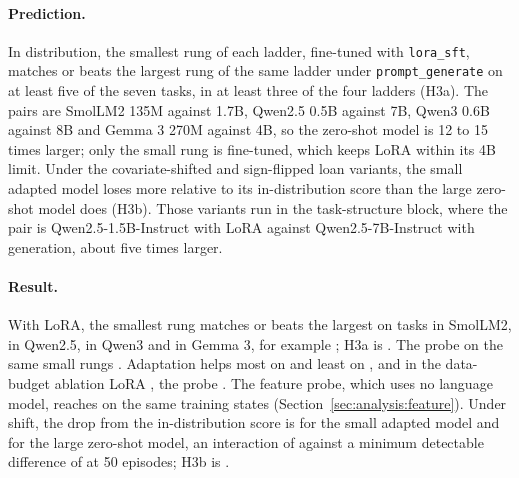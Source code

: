 \paragraph{Prediction.} In distribution, the smallest rung of each ladder, fine-tuned with \texttt{lora\_sft}, matches or beats the largest rung of the same ladder under \texttt{prompt\_generate} on at least five of the seven tasks, in at least three of the four ladders (H3a). The pairs are SmolLM2 135M against 1.7B, Qwen2.5 0.5B against 7B, Qwen3 0.6B against 8B and Gemma 3 270M against 4B, so the zero-shot model is 12 to 15 times larger; only the small rung is fine-tuned, which keeps LoRA within its 4B limit. Under the covariate-shifted and sign-flipped loan variants, the small adapted model loses more relative to its in-distribution score than the large zero-shot model does (H3b). Those variants run in the task-structure block, where the pair is Qwen2.5-1.5B-Instruct with LoRA against Qwen2.5-7B-Instruct with generation, about five times larger.

\paragraph{Result.} With LoRA, the smallest rung matches or beats the largest on \result{[$k$ of 7]} tasks in SmolLM2, \result{[$k$ of 7]} in Qwen2.5, \result{[$k$ of 7]} in Qwen3 and \result{[$k$ of 7]} in Gemma 3, for example ; H3a is . The probe on the same small rungs . Adaptation helps most on \result{[tasks]} and least on \result{[tasks]}, and in the data-budget ablation LoRA , the probe \result{[likewise]}. The feature probe, which uses no language model, reaches  on the same training states (Section~\ref{sec:analysis:feature}). Under shift, the drop from the in-distribution score is  for the small adapted model and  for the large zero-shot model, an interaction of  against a minimum detectable difference of \result{[value]} at 50 episodes; H3b is . 

